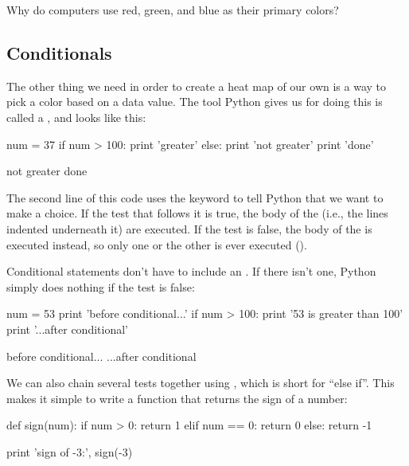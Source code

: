 \begin{challenge}
  Why do computers use red, green, and blue as their primary colors?
\end{challenge}

\subsection{Conditionals}

The other thing we need in order to create a heat map of our own is a
way to pick a color based on a data value. The tool Python gives us for
doing this is called a , and looks like this:

\begin{VerbIn}
num = 37
if num > 100:
    print 'greater'
else:
    print 'not greater'
print 'done'
\end{VerbIn}

\begin{VerbOut}
not greater
done
\end{VerbOut}

The second line of this code uses the keyword  to tell Python
that we want to make a choice. If the test that follows it is true, the
body of the  (i.e., the lines indented underneath it) are
executed. If the test is false, the body of the  is
executed instead, so only one or the other is ever executed ().


Conditional statements don't have to include an . If there
isn't one, Python simply does nothing if the test is false:

\begin{VerbIn}
num = 53
print 'before conditional...'
if num > 100:
    print '53 is greater than 100'
print '...after conditional'
\end{VerbIn}

\begin{VerbOut}
before conditional...
...after conditional
\end{VerbOut}

We can also chain several tests together using , which is
short for ``else if''. This makes it simple to write a function that
returns the sign of a number:

\begin{VerbIn}
def sign(num):
    if num > 0:
        return 1
    elif num == 0:
        return 0
    else:
        return -1

print 'sign of -3:', sign(-3)
\end{VerbIn}


